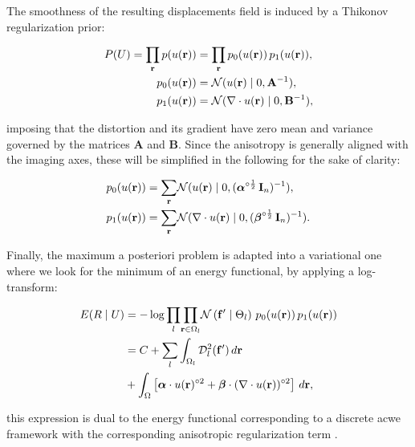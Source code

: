 The smoothness of the resulting displacements field is induced by a Thikonov regularization
  prior:

  \begin{align*}
  P(U) = \underset{\vec{r}}{\prod}\, p(u(\vec{r})) &=
  \underset{\vec{r}}{\prod}\, p_0(u(\vec{r})) \, p_1(u(\vec{r})), \\
  p_0(u(\vec{r})) &= \mathcal{N}( u(\vec{r}) \mid 0, \mathbf{A}^{-1}), \notag\\
  p_1(u(\vec{r})) &= \mathcal{N}(  \nabla \cdot u(\vec{r}) \mid 0, \mathbf{B}^{-1}),
  \end{align*}

  imposing that the distortion and its gradient have zero
  mean and variance governed by the matrices $\mathbf{A}$ and $\mathbf{B}$.
Since the anisotropy is generally aligned with the imaging axes, these will be simplified
  in the following for the sake of clarity:

  \begin{align}
    p_0(u(\vec{r})) &= \underset{\vec{r}}{\sum} \mathcal{N}( u(\vec{r}) \mid 0,
      (\boldsymbol{\alpha}^{\circ\frac12}\,\vec{I}_n)^{-1}), \notag\\
    p_1(u(\vec{r})) &= \underset{\vec{r}}{\sum} \mathcal{N}( \nabla \cdot u(\vec{r}) \mid 0,
      (\boldsymbol{\beta}^{\circ\frac12}\,\vec{I}_n)^{-1}).
  \label{eq:priors}
  \end{align}


Finally, the maximum a posteriori problem is adapted into a variational one where we look for
  the minimum of an energy functional, by applying a log-transform:

  \begin{align}
  E(R \mid U) &= -\log \underset{l}{\prod}
  \underset{\vec{r} \in \Omega_l}{\prod}
  \mathcal{N} \left( \vec{f}' \mid \Theta_l \right)\,p_0( u(\vec{r}))\,p_1( u(\vec{r})) \notag\\
  &= C + \underset{l}{\sum} \int_{\Omega_l}
  \mdist{f'}{l} \,d\vec{r} \notag\\
  &+ \int_{\Omega} \left[ \boldsymbol{\alpha} \cdot u(\vec{r})^{\circ2}
  + \boldsymbol{\beta} \cdot (\nabla \cdot u(\vec{r}))^{\circ2} \right] \,d\vec{r},
  \label{eq:energy}
  \end{align}

  this expression is dual to the energy functional corresponding
  to a discrete \gls*{acwe} framework \citep{chan_active_2001}
  with the corresponding anisotropic regularization term \citep{nagel_investigation_1986}.


